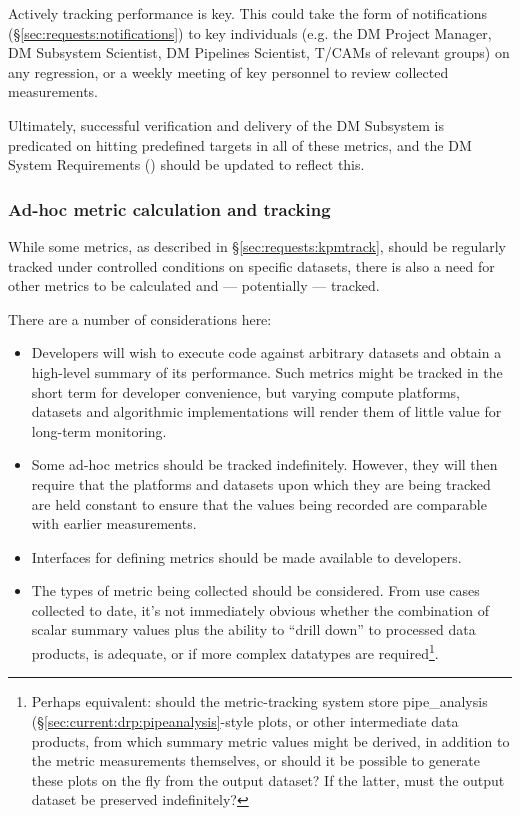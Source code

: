 \documentclass[DM,authoryear,toc,lsstdraft]{lsstdoc}
\begin{document}
Actively tracking performance is key. This could take the form of
notifications (\S\ref{sec:requests:notifications}) to key individuals (e.g.
the DM Project Manager, DM Subsystem Scientist, DM Pipelines Scientist, T/CAMs
of relevant groups) on any regression, or a weekly meeting of key personnel to
review collected measurements.

Ultimately, successful verification and delivery of the DM Subsystem is
predicated on hitting predefined targets in all of these \glspl{metric}, and
the DM System Requirements () should be updated to reflect
this.

\subsubsection{Ad-hoc metric calculation and tracking}
\label{sec:requests:adhoctrack}

While some \glspl{metric}, as described in \S\ref{sec:requests:kpmtrack},
should be regularly tracked under controlled conditions on specific datasets,
there is also a need for other metrics to be calculated and --- potentially
--- tracked.

There are a number of considerations here:

\begin{itemize}

  \item{Developers will wish to execute code against arbitrary datasets and
  obtain a high-level summary of its performance. Such metrics might be
  tracked in the short term for developer convenience, but varying compute
  platforms, datasets and algorithmic implementations will render them of
  little value for long-term monitoring.}

  \item{Some ad-hoc metrics should be tracked indefinitely. However, they will
  then require that the platforms and datasets upon which they are being
  tracked are held constant to ensure that the values being recorded are
  comparable with earlier measurements.}

  \item{Interfaces for defining metrics should be made available to
  developers.}

  \item{The types of metric being collected should be considered. From use
  cases collected to date, it's not immediately obvious whether the
  combination of scalar summary values plus the ability to “drill down” to
  processed data products, is adequate, or if more complex datatypes are
  required\footnote{Perhaps equivalent: should the metric-tracking system
  store pipe\_analysis (\S\ref{sec:current:drp:pipeanalysis}-style plots, or
  other intermediate data products, from which summary metric values might be
  derived, in addition to the metric measurements themselves, or should it be
  possible to generate these plots on the fly from the output dataset? If the
  latter, must the output dataset be preserved indefinitely?}.}

\end{itemize}
\end{document}
